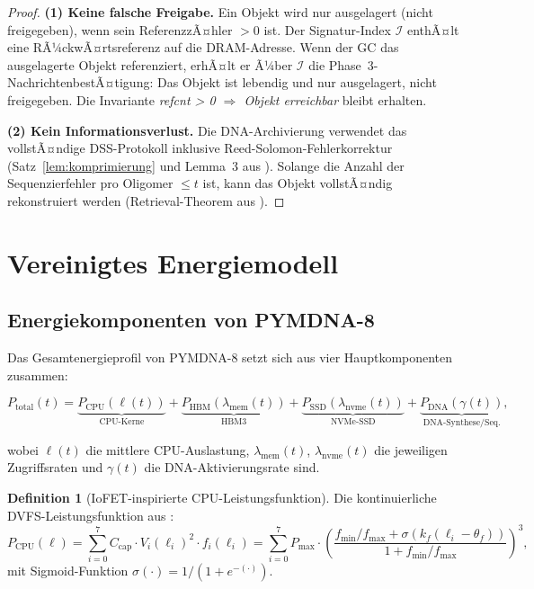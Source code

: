 ﻿\documentclass[a4paper,12pt]{article}
\theoremstyle{definition}
\newtheorem{definition}{Definition}[section]
\begin{document}
\begin{proof}
  \textbf{(1) Keine falsche Freigabe.} Ein Objekt wird nur ausgelagert
  (nicht freigegeben), wenn sein ReferenzzÃ¤hler $> 0$ ist. Der Signatur-Index
  $\mathcal{I}$ enthÃ¤lt eine RÃ¼ckwÃ¤rtsreferenz auf die DRAM-Adresse.
  Wenn der GC das ausgelagerte Objekt referenziert, erhÃ¤lt er Ã¼ber
  $\mathcal{I}$ die Phase~3-NachrichtenbestÃ¤tigung: Das Objekt ist
  lebendig und nur ausgelagert, nicht freigegeben. Die Invariante
  \emph{refcnt > 0 $\Rightarrow$ Objekt erreichbar} bleibt erhalten.

  \textbf{(2) Kein Informationsverlust.} Die DNA-Archivierung verwendet
  das vollstÃ¤ndige DSS-Protokoll inklusive Reed-Solomon-Fehlerkorrektur
  (Satz~\ref{lem:komprimierung} und Lemma~3 aus \cite{epp2026dnastor}).
  Solange die Anzahl der Sequenzierfehler pro Oligomer $\le t$ ist,
  kann das Objekt vollstÃ¤ndig rekonstruiert werden (Retrieval-Theorem
  aus \cite{epp2026dnastor}).
\end{proof}

\section{Vereinigtes Energiemodell}

\subsection{Energiekomponenten von PYMDNA-8}

Das Gesamtenergieprofil von PYMDNA-8 setzt sich aus vier Hauptkomponenten zusammen:

\begin{equation}
  P_{\mathrm{total}}(t) = \underbrace{P_{\mathrm{CPU}}(\ell(t))}_{\text{CPU-Kerne}}
  + \underbrace{P_{\mathrm{HBM}}(\lambda_{\mathrm{mem}}(t))}_{\text{HBM3}}
  + \underbrace{P_{\mathrm{SSD}}(\lambda_{\mathrm{nvme}}(t))}_{\text{NVMe-SSD}}
  + \underbrace{P_{\mathrm{DNA}}(\gamma(t))}_{\text{DNA-Synthese/Seq.}},
  \label{eq:p_total}
\end{equation}

\noindent wobei $\ell(t)$ die mittlere CPU-Auslastung, $\lambda_{\mathrm{mem}}(t)$,
$\lambda_{\mathrm{nvme}}(t)$ die jeweiligen Zugriffsraten und $\gamma(t)$
die DNA-Aktivierungsrate sind.

\begin{definition}[IoFET-inspirierte CPU-Leistungsfunktion]
  \label{def:iofet_power}
  Die kontinuierliche DVFS-Leistungsfunktion aus \cite{epp2026pymca8}:
  \begin{equation}
    P_{\mathrm{CPU}}(\ell) = \sum_{i=0}^{7}
    C_{\mathrm{cap}} \cdot V_i(\ell_i)^2 \cdot f_i(\ell_i)
    = \sum_{i=0}^{7} P_{\max} \cdot
    \left(\frac{f_{\min}/f_{\max} + \sigma(k_f(\ell_i - \theta_f))}
    {1 + f_{\min}/f_{\max}}\right)^3,
  \end{equation}
  mit Sigmoid-Funktion $\sigma(\cdot) = 1/(1+e^{-(\cdot)})$.
\end{definition}
\end{document}
